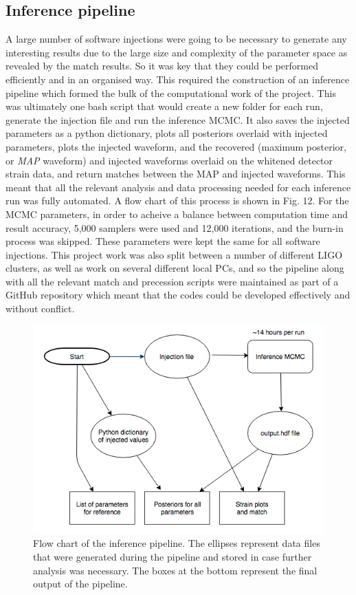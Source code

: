 \documentclass[11pt]{article}
\begin{document}
\subsection{Inference pipeline}
A large number of software injections were going to be necessary to generate any interesting results due to the large size and complexity of the parameter space as revealed by the match results. So it was key that they could be performed efficiently and in an organised way. This required the construction of an inference pipeline which formed the bulk of the computational work of the project. This was ultimately one bash script that would create a new folder for each run, generate the injection file and run the inference MCMC.  It also saves the injected parameters as a python dictionary, plots all posteriors overlaid with injected parameters, plots the injected waveform, and the recovered (maximum posterior, or \textit{MAP} waveform) and injected waveforms overlaid on the whitened detector strain data, and return matches between the MAP and injected waveforms. This meant that all the relevant analysis and data processing needed for each inference run was fully automated. A flow chart of this process is shown in Fig. 12. For the MCMC parameters, in order to acheive a balance between computation time and result accuracy, 5,000 samplers were used and 12,000 iterations, and the burn-in process was skipped. These parameters were kept the same for all software injections.
This project work was also split between a number of different LIGO clusters, as well as work on several different local PCs, and so the pipeline along with all the relevant match and precession scripts were maintained as part of a GitHub repository which meant that the codes could be developed effectively and without conflict.
\begin{figure}
	\includegraphics[scale=0.55]{fig13.png}
	\centering
	\caption{Flow chart of the inference pipeline. The ellipses represent data files that were generated during the pipeline and stored in case further analysis was necessary. The boxes at the bottom represent the final output of the pipeline.}
	\centering
\end{figure}
\end{document}
